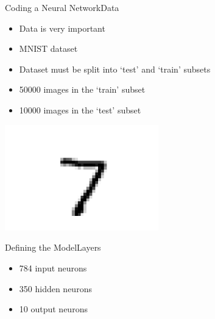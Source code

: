 \documentclass{beamer}
\begin{document}
\begin{frame}{Coding a Neural Network}{Data}
\begin{multicols}{2}
    \begin{itemize}
        \item Data is very important
        \item MNIST dataset
        \item Dataset must be split into `test' and `train' subsets
        \item 50000 images in the `train' subset
        \item 10000 images in the `test' subset
    \end{itemize}
    \begin{center}
        \includegraphics[width=0.5\textwidth]{images/mnist_example}
    \end{center}
\end{multicols}
\end{frame}

\begin{frame}{Defining the Model}{Layers}
    \begin{itemize}
        \item 784 input neurons
        \item 350 hidden neurons
        \item 10 output neurons
    \end{itemize}
\end{frame}
\end{document}
